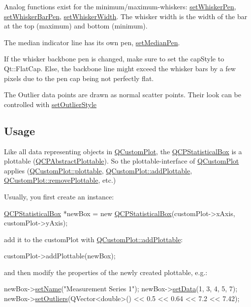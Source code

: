 Analog functions exist for the minimum/maximum-\/whiskers\+: \hyperlink{class_q_c_p_statistical_box_a4a5034cb3b9b040444df05ab1684620b}{set\+Whisker\+Pen}, \hyperlink{class_q_c_p_statistical_box_aa8d3e503897788e1abf68dc74b5f147f}{set\+Whisker\+Bar\+Pen}, \hyperlink{class_q_c_p_statistical_box_adf378812446bd66f34d1f7f293d991cd}{set\+Whisker\+Width}. The whisker width is the width of the bar at the top (maximum) and bottom (minimum).

The median indicator line has its own pen, \hyperlink{class_q_c_p_statistical_box_a7260ac55b669f5d0a74f16d5ca84c52c}{set\+Median\+Pen}.

If the whisker backbone pen is changed, make sure to set the cap\+Style to Qt\+::\+Flat\+Cap. Else, the backbone line might exceed the whisker bars by a few pixels due to the pen cap being not perfectly flat.

The Outlier data points are drawn as normal scatter points. Their look can be controlled with \hyperlink{class_q_c_p_statistical_box_ad5241943422eb8e58360a97e99ad6aa7}{set\+Outlier\+Style}\hypertarget{class_q_c_p_statistical_box_usage}{}\subsection{Usage}\label{class_q_c_p_statistical_box_usage}
Like all data representing objects in \hyperlink{class_q_custom_plot}{Q\+Custom\+Plot}, the \hyperlink{class_q_c_p_statistical_box}{Q\+C\+P\+Statistical\+Box} is a plottable (\hyperlink{class_q_c_p_abstract_plottable}{Q\+C\+P\+Abstract\+Plottable}). So the plottable-\/interface of \hyperlink{class_q_custom_plot}{Q\+Custom\+Plot} applies (\hyperlink{class_q_custom_plot_a32de81ff53e263e785b83b52ecd99d6f}{Q\+Custom\+Plot\+::plottable}, \hyperlink{class_q_custom_plot_ab7ad9174f701f9c6f64e378df77927a6}{Q\+Custom\+Plot\+::add\+Plottable}, \hyperlink{class_q_custom_plot_af3dafd56884208474f311d6226513ab2}{Q\+Custom\+Plot\+::remove\+Plottable}, etc.)

Usually, you first create an instance\+: 
\begin{DoxyCode}
\hyperlink{class_q_c_p_statistical_box}{QCPStatisticalBox} *newBox = \textcolor{keyword}{new} \hyperlink{class_q_c_p_statistical_box_a75c2b3e7fcd0741cc981693a2ba63b27}{QCPStatisticalBox}(customPlot->xAxis, 
      customPlot->yAxis);
\end{DoxyCode}
 add it to the custom\+Plot with \hyperlink{class_q_custom_plot_ab7ad9174f701f9c6f64e378df77927a6}{Q\+Custom\+Plot\+::add\+Plottable}\+: 
\begin{DoxyCode}
customPlot->addPlottable(newBox);
\end{DoxyCode}
 and then modify the properties of the newly created plottable, e.\+g.\+: 
\begin{DoxyCode}
newBox->\hyperlink{class_q_c_p_abstract_plottable_ab79c7ba76bc7fa89a4b3580e12149f1f}{setName}(\textcolor{stringliteral}{"Measurement Series 1"});
newBox->\hyperlink{class_q_c_p_statistical_box_adf50c57b635edb12470c0e4a986aff37}{setData}(1, 3, 4, 5, 7);
newBox->\hyperlink{class_q_c_p_statistical_box_af9bc09620e0bf93bf444ee35e5800d1d}{setOutliers}(QVector<double>() << 0.5 << 0.64 << 7.2 << 7.42);
\end{DoxyCode}
 

